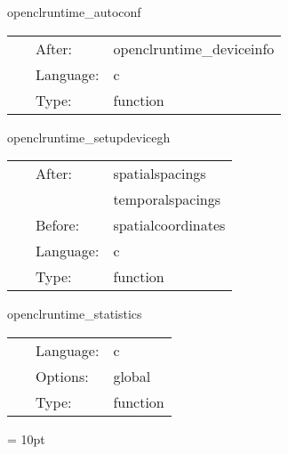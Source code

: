 \vspace{5mm}


\hspace{5mm} openclruntime\_autoconf 

\hspace{5mm}{\it determine whether certain features are supported } 


\hspace{5mm}

 \begin{tabular*}{160mm}{cll} 
~ & After:  & openclruntime\_deviceinfo \\ 
~ & Language:  & c \\ 
~ & Type:  & function \\ 
\end{tabular*} 


\vspace{5mm}


\hspace{5mm} openclruntime\_setupdevicegh 

\hspace{5mm}{\it set up device grid structure } 


\hspace{5mm}

 \begin{tabular*}{160mm}{cll} 
~ & After:  & spatialspacings \\ 
~& ~ &temporalspacings\\ 
~ & Before:  & spatialcoordinates \\ 
~ & Language:  & c \\ 
~ & Type:  & function \\ 
\end{tabular*} 


\vspace{5mm}


\hspace{5mm} openclruntime\_statistics 

\hspace{5mm}{\it output profiling information } 


\hspace{5mm}

 \begin{tabular*}{160mm}{cll} 
~ & Language:  & c \\ 
~ & Options:  & global \\ 
~ & Type:  & function \\ 
\end{tabular*} 



\vspace{5mm}\parskip = 10pt 

